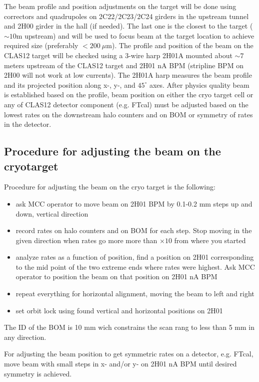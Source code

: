 The beam profile and position adjustments on the target will be done using correctors and quadrupoles on 2C22/2C23/2C24 girders in the upstream tunnel and 2H00 girder in the hall (if needed). The last one is the closest to the target ($\sim 10$m upstream) and will be used to focus beam at the target location to achieve required size (preferably $<200~\mu$m). The profile and position of the beam on the CLAS12 target will be checked using a 3-wire harp 2H01A mounted about $\sim 7$ meters upstream of the CLAS12 target and 2H01 nA BPM (stripline BPM on 2H00 will not work at low currents). The 2H01A harp measures the beam profile and its projected position along x-, y-, and $45^\circ$ axes. After physics quality beam is established based on the profile, beam position on either the cryo target cell or any of CLAS12 detector component (e.g. FTcal) must be adjusted based on the lowest rates on the downstream halo counters and on BOM or symmetry of rates in the detector. 
\subsection{Procedure for adjusting the beam on the cryotarget} 
Procedure for adjusting the beam on the cryo target is the following:
\begin{itemize}
\item ask MCC operator to move beam on 2H01 BPM by 0.1-0.2 mm steps up and down, vertical direction
\item record rates on halo counters and on BOM for each step. Stop moving in the given direction when rates go more more than $\times 10$ from where you started 
\item analyze rates as a function of position, find a position on 2H01 corresponding to the mid point of the two extreme ends where rates were highest. Ask MCC operator to position the beam on that position on 2H01 nA BPM
\item  repeat everything for horizontal alignment, moving the beam to left and right 
\item set orbit lock using found vertical and horizontal positions on 2H01 
\end{itemize}

The ID of the BOM is 10 mm wich constrains the scan rang to less than 5 mm in any direction.

For adjusting the beam position to get symmetric rates on a detector, e.g. FTcal, move beam with small steps in x- and/or y- on 2H01 nA BPM until desired symmetry is achieved.  
\vspace{1.cm}

